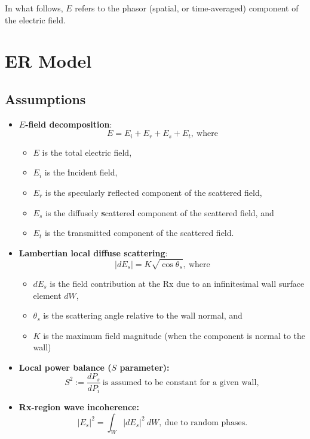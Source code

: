 \documentclass{article}
\begin{document}
In what follows, $E$ refers to the phasor (spatial, or time-averaged) component of
the electric field.
\section{ER Model} 
\subsection*{Assumptions}
\begin{itemize}
   \item \textbf{$E$-field decomposition}:
      \begin{equation}
         E = E_i + E_r + E_s + E_t, \ \text{where}
         \label{eq:eDecomp}
      \end{equation}
   \begin{itemize}
       \item $E$ is the total electric field,
       \item $E_i$ is the \textbf{i}ncident field, 
       \item $E_r$ is the specularly \textbf{r}eflected component of the scattered field,
       \item $E_s$ is the diffusely \textbf{s}cattered component of the scattered field, and
       \item $E_t$ is the \textbf{t}ransmitted component of the scattered field. 
   \end{itemize}
   \item \textbf{Lambertian local diffuse scattering}: 
   \begin{equation}
      | dE_s | = K \sqrt{\cos \theta_s}, \ \text{where} 
      \label{eq:lambertianLocalDiffuse}
   \end{equation}
   \begin{itemize}
      \item $dE_s$ is the field contribution at the Rx due to an infinitesimal
         wall surface element $dW$,
      \item $\theta_s$ is the scattering angle relative to the wall normal, and
      \item $K$ is the maximum field magnitude (when the component is normal to the
         wall)
   \end{itemize}
\item \textbf{Local power balance ($S$ parameter):}
      \begin{equation}
         S^2 := \frac{ dP_s }{ dP_i } \ \text{is assumed to be constant for a
         given wall},
         \label{eq:sDef}
      \end{equation}
   \item \textbf{Rx-region wave incoherence:} 
      \begin{equation}
         | E_{s} |^2 = \int_W | dE_s |^2 \ dW, \ \text{due to random phases.}
         \label{eq:incoherence}
      \end{equation}
\end{itemize}
\end{document}
